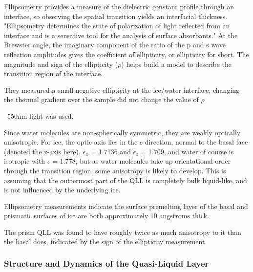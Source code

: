 %
%

Ellipsometry provides a measure of the dielectric constant profile through an interface, so observing the spatial transition yields an interfacial thickness. "Ellipsometry determines the state of polarization of light reflected from an interface and is a sensative tool for the analysis of surface absorbants." At the Brewster angle, the imaginary component of the ratio of the p and s wave reflection amplitudes gives the coefficient of ellipticity, or ellipticity for short. The magnitude and sign of the ellipticity ($\rho$) helps build a model to describe the transition region of the interface.

They measured a small negative ellipticity at the ice/water interface, changing the thermal gradient over the sample did not change the value of $\rho$  

~550nm light was used.

Since water molecules are non-spherically symmetric, they are weakly
optically anisotropic. For ice, the optic axis lies in the c
direction, normal to the basal face (denoted the z-axis
here). $\epsilon_{x}$ = 1.7136 and $\epsilon_{z}$ = 1.709, and water
of course is isotropic with $\epsilon$ = 1.778, but as water molecules
take up orientational order through the transition region, some
anisotropy is likely to develop. This is assuming that the outtermost
part of the QLL is completely bulk liquid-like, and is not influenced
by the underlying ice.

Ellipsometry measurements indicate the surface premelting layer of the basal and prismatic surfaces of ice are both approximately 10 angstroms thick.

The prism QLL was found to have roughly twice as much anisotropy to it
than the basal does, indicated by the sign of the ellipticity
measurement.
\subsubsection{Structure and Dynamics of the Quasi-Liquid Layer}

